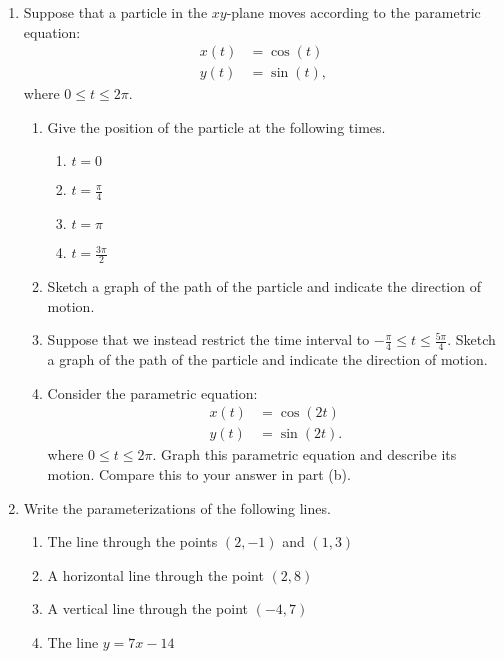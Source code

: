 \documentclass[11pt]{article}
\begin{document}
\drawtitle

\begin{enumerate}

\item Suppose that a particle in the $xy$-plane moves according to the
  parametric equation:
  \begin{align*}
    x(t) &= \cos(t)\\
    y(t) &= \sin(t),
  \end{align*}
  where $0\leq t\leq 2\pi$.
  \begin{enumerate}
  \item Give the position of the particle at the following times.
    \begin{enumerate}
    \item $t = 0$
      \vfill
    \item $t = \frac{\pi}{4}$
      \vfill
    \item $t = \pi$
      \vfill
    \item $t = \frac{3\pi}{2}$
      \vfill
    \end{enumerate}

  \item Sketch a graph of the path of the particle and indicate the
    direction of motion.
    \vfill\vfill\vfill\vfill
    
    \newpage

  \item Suppose that we instead restrict the time interval to
    $-\frac{\pi}{4}\leq t \leq \frac{5\pi}{4}$. Sketch a graph of the
    path of the particle and indicate the direction of motion.
    \vfill

  \item Consider the parametric equation:
    \begin{align*}
      x(t) &= \cos(2t)\\
      y(t) &= \sin(2t).
    \end{align*}
    where $0\leq t\leq 2\pi$. Graph this parametric equation and
    describe its motion. Compare this to your answer in part (b).

    \vfill\vfill


  \end{enumerate}


  \newpage

\item Write the parameterizations of the following lines.
  \begin{enumerate}
  \item The line through the points $(2,-1)$ and $(1,3)$
    \vfill
  \item A horizontal line through the point $(2, 8)$
    \vfill
  \item A vertical line through the point $(-4, 7)$
    \vfill
  \item The line $y=7x-14$
    \vfill
  \end{enumerate}
  \newpage


\end{enumerate}
\end{document}
